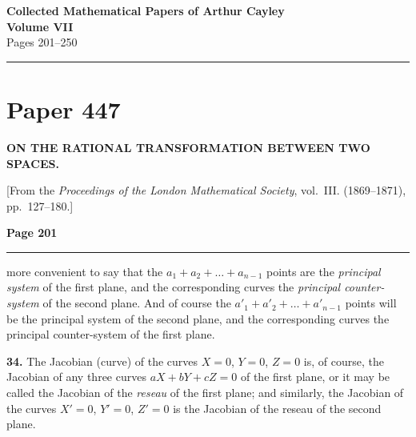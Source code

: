 \documentclass[12pt,a4paper]{article}
\theoremstyle{plain}
\theoremstyle{definition}
\theoremstyle{remark}
\begin{document}
\begin{center}
{\Large\textbf{Collected Mathematical Papers of Arthur Cayley}}\\[6pt]
{\large\textbf{Volume VII}}\\[12pt]
{\large Pages 201--250}\\[2em]
\noindent\rule{\textwidth}{0.4pt}
\end{center}

\thispagestyle{empty}
\newpage

\section*{Paper 447}

\begin{center}
\textbf{ON THE RATIONAL TRANSFORMATION BETWEEN TWO SPACES.}
\end{center}

\begin{center}
[From the \textit{Proceedings of the London Mathematical Society}, vol.~\textsc{III}. (1869--1871), pp.~127--180.]
\end{center}

\setcounter{page}{201}
\newpage
\noindent\textbf{Page 201}\\
\noindent\rule{\textwidth}{0.4pt}

\smallskip

\noindent more convenient to say that the $a_1 + a_2 + \ldots + a_{n-1}$ points are the \textit{principal system} of the first plane, and the corresponding curves the \textit{principal counter-system} of the second plane. And of course the $a'_1 + a'_2 + \ldots + a'_{n-1}$ points will be the principal system of the second plane, and the corresponding curves the principal counter-system of the first plane.

\textbf{34.} The Jacobian (curve) of the curves $X = 0$, $Y = 0$, $Z = 0$ is, of course, the Jacobian of any three curves $aX + bY + cZ = 0$ of the first plane, or it may be called the Jacobian of the \textit{reseau} of the first plane; and similarly, the Jacobian of the curves $X' = 0$, $Y' = 0$, $Z' = 0$ is the Jacobian of the reseau of the second plane.
\end{document}
